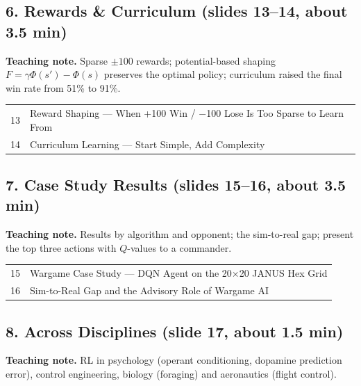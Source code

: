 \documentclass[11pt]{article}
\begin{document}
\subsection{6. Rewards \& Curriculum \normalfont\small\color{GreyN}(slides 13--14, about 3.5 min)}

\textbf{Teaching note.} Sparse $\pm100$ rewards; potential-based shaping $F=\gamma\Phi(s')-\Phi(s)$ preserves the optimal policy; curriculum raised the final win rate from 51\% to 91\%.

\begin{center}\small\renewcommand{\arraystretch}{1.1}\begin{tabularx}{\textwidth}{@{}r X@{}}13 & Reward Shaping --- When +100 Win / $-$100 Lose Is Too Sparse to Learn From\\
14 & Curriculum Learning --- Start Simple, Add Complexity\\\end{tabularx}\end{center}

\subsection{7. Case Study Results \normalfont\small\color{GreyN}(slides 15--16, about 3.5 min)}

\textbf{Teaching note.} Results by algorithm and opponent; the sim-to-real gap; present the top three actions with $Q$-values to a commander.

\begin{center}\small\renewcommand{\arraystretch}{1.1}\begin{tabularx}{\textwidth}{@{}r X@{}}15 & Wargame Case Study --- DQN Agent on the 20$\times$20 JANUS Hex Grid\\
16 & Sim-to-Real Gap and the Advisory Role of Wargame AI\\\end{tabularx}\end{center}

\subsection{8. Across Disciplines \normalfont\small\color{GreyN}(slide 17, about 1.5 min)}

\textbf{Teaching note.} RL in psychology (operant conditioning, dopamine prediction error), control engineering, biology (foraging) and aeronautics (flight control).
\end{document}
